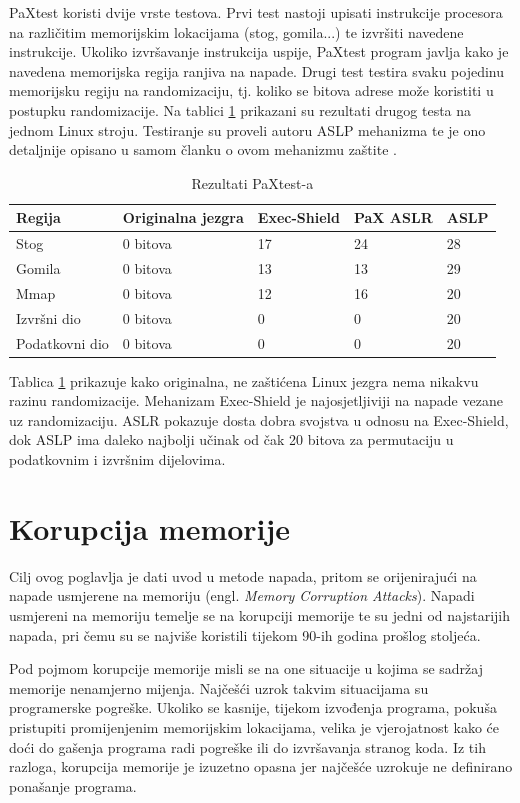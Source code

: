 \documentclass[times, utf8, diplomski, numeric]{fer}
\begin{document}
PaXtest koristi dvije vrste testova. Prvi test nastoji upisati
instrukcije procesora na različitim memorijskim lokacijama (stog,
gomila...) te izvršiti navedene instrukcije. Ukoliko izvršavanje
instrukcija uspije, PaXtest program javlja kako je navedena
memorijska regija ranjiva na napade. Drugi test testira svaku
pojedinu memorijsku regiju na randomizaciju, tj. koliko se bitova
adrese može koristiti u postupku randomizacije. Na tablici
\ref{tbl:paxtest_results} prikazani su rezultati drugog testa na
jednom Linux stroju. Testiranje su proveli autoru ASLP mehanizma te
je ono detaljnije opisano u samom članku o ovom mehanizmu zaštite \citep{aslp}.

\begin{table}[htb]
\small
\caption{Rezultati PaXtest-a}
\label{tbl:paxtest_results}
\centering
\begin{tabular}{|l|l|l|l|l|}
\hline
Regija & Originalna jezgra & Exec-Shield & PaX ASLR & ASLP \\ \hline
Stog & 0 bitova & 17 & 24 & 28 \\ \hline
Gomila & 0 bitova & 13 & 13 & 29 \\ \hline
Mmap & 0 bitova & 12 & 16 & 20 \\ \hline
Izvršni dio & 0 bitova & 0 & 0 & 20 \\ \hline
Podatkovni dio & 0 bitova & 0 & 0 & 20 \\ \hline
\end{tabular}
\end{table}

Tablica \ref{tbl:paxtest_results} prikazuje kako originalna, ne
zaštićena Linux jezgra nema nikakvu razinu randomizacije.
Mehanizam Exec-Shield je najosjetljiviji na napade vezane uz
randomizaciju. ASLR pokazuje dosta dobra svojstva u odnosu na
Exec-Shield, dok ASLP ima daleko najbolji učinak od čak 20 bitova
za permutaciju u podatkovnim i izvršnim dijelovima.

\chapter{Korupcija memorije}

Cilj ovog poglavlja je dati uvod u metode napada, pritom se
orijenirajući na napade usmjerene na memoriju (engl. \emph{Memory
Corruption Attacks}).  Napadi usmjereni na memoriju temelje se na
korupciji memorije te su jedni od najstarijih napada, pri čemu su se
najviše koristili tijekom 90-ih godina prošlog stoljeća.

Pod pojmom korupcije memorije misli se na one situacije u kojima
se sadržaj memorije nenamjerno mijenja. Najčešći uzrok takvim
situacijama su programerske pogreške. Ukoliko se kasnije, tijekom
izvođenja programa, pokuša pristupiti promijenjenim memorijskim
lokacijama, velika je vjerojatnost kako će doći do gašenja
programa radi pogreške ili do izvršavanja stranog koda. Iz tih
razloga, korupcija memorije je izuzetno opasna jer najčešće
uzrokuje ne definirano ponašanje programa. 
\end{document}
